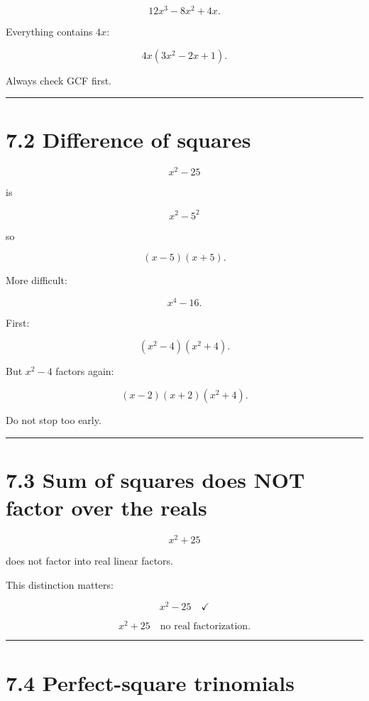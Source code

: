 \documentclass[
]{article}
\begin{document}
\[
12x^3-8x^2+4x.
\]

Everything contains \(4x\):

\[
\boxed{4x(3x^2-2x+1)}.
\]

Always check GCF first.

\begin{center}\rule{0.5\linewidth}{0.5pt}\end{center}

\section{7.2 Difference of squares}\label{difference-of-squares-1}

\[
x^2-25
\]

is

\[
x^2-5^2
\]

so

\[
\boxed{(x-5)(x+5)}.
\]

More difficult:

\[
x^4-16.
\]

First:

\[
(x^2-4)(x^2+4).
\]

But \(x^2-4\) factors again:

\[
\boxed{(x-2)(x+2)(x^2+4)}.
\]

Do not stop too early.

\begin{center}\rule{0.5\linewidth}{0.5pt}\end{center}

\section{7.3 Sum of squares does NOT factor over the
reals}\label{sum-of-squares-does-not-factor-over-the-reals}

\[
x^2+25
\]

does not factor into real linear factors.

This distinction matters:

\[
x^2-25 \quad \checkmark
\]

\[
x^2+25 \quad \text{no real factorization}.
\]

\begin{center}\rule{0.5\linewidth}{0.5pt}\end{center}

\section{7.4 Perfect-square trinomials}\label{perfect-square-trinomials}
\end{document}

